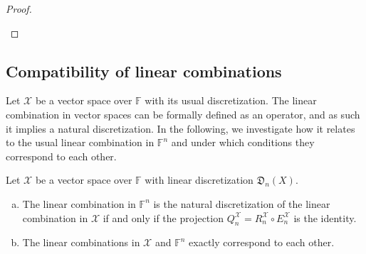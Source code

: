 \documentclass[a4paper]{paper}
\newcommand*{\SPC}[1]{{\ensuremath{\mathscr{#1}}}}
\newcommand*{\SPCX}{\SPC{X}}
\newcommand{\FIELD}{{\ensuremath{\mathbb{F}}}}
\newcommand*{\Fn}{{\ensuremath{\FIELD^n}}}
\newcommand*{\EXT}[2]{\ensuremath{E_{#1}^{#2}}}
\newcommand*{\REST}[2]{\ensuremath{R_{#1}^{#2}}}
\newcommand*{\COPROJ}[2]{\ensuremath{Q_{#1}^{#2}}}
\newcommand*{\RnX}{{\ensuremath{\REST{n}{\SPC{X}}}}}
\newcommand*{\EnX}{{\ensuremath{\EXT{n}{\SPC{X}}}}}
\newcommand*{\QnX}{{\ensuremath{\COPROJ{n}{\SPCX}}}}
\newcommand*{\DISCR}[2]{{\ensuremath{\mathfrak{D}_{#2}(#1)}}}
\newcommand*{\DISCRnX}{\DISCR{X}{n}}
\begin{document}
\begin{proof}
\begin{enumerate}[(a)]
 \end{enumerate}
\end{proof}



\subsection{Compatibility of linear combinations}
\label{subsec:prop:lincomb}

Let $\SPCX$ be a vector space over $\FIELD$ with its usual discretization. The linear combination in vector spaces 
can be formally defined as an operator, and as such it implies a natural discretization. In the following, we 
investigate how it relates to the usual linear combination in $\Fn$ and under which conditions they correspond to 
each other.


\begin{lemma}
 \label{lemma:prop:lincomb:natural_corresp}
 Let $\SPCX$ be a vector space over $\FIELD$ with linear discretization $\DISCRnX$.
 \begin{enumerate}[(a)]
  \item The linear combination in $\Fn$ is the natural discretization of the linear combination in $\SPCX$ if 
  and only if the projection $\QnX = \RnX \circ \EnX$ is the identity.
  
  \item The linear combinations in $\SPCX$ and $\Fn$ exactly correspond to each other.
 \end{enumerate}
\end{lemma}
\vspace{1em}
\end{document}
